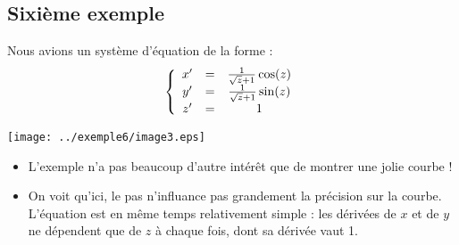 \subsection{Sixième exemple}

Nous avions un système d'équation de la forme :
\[\left\{ \begin{array}{c c c}
x' &=& \frac{1}{\sqrt{z}+1}\cos(z)\\
y' &=& \frac{1}{\sqrt{z}+1}\sin(z)\\
z' &=& 1
\end{array}\right.\]

\begin{center}
\texttt{[image: ../exemple6/image3.eps]}
\end{center}

\begin{itemize}
	\item L'exemple n'a pas beaucoup d'autre intérêt que de montrer une jolie courbe !
	\item On voit qu'ici, le pas n'influance pas grandement la précision sur la courbe. L'équation est en même temps relativement simple : les dérivées de $x$ et de $y$ ne dépendent que de $z$ à chaque fois, dont sa dérivée vaut 1. 
\end{itemize}
